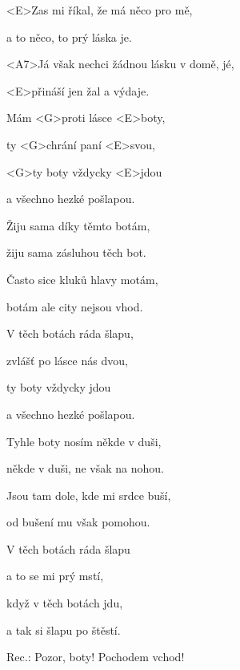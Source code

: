 

\zs
<E>Zas mi říkal, že má něco pro mě,

a to něco, to prý láska je.

<A7>Já však nechci žádnou lásku v domě, jé,

<E>přináší jen žal a výdaje.

Mám <G>proti lásce <E>boty,

ty <G>chrání paní <E>svou,

<G>ty boty vždycky <E>jdou

a všechno hezké pošlapou.
\ks

\zs
Žiju sama díky těmto botám,

žiju sama zásluhou těch bot.

Často sice kluků hlavy motám,

botám ale city nejsou vhod.

V těch botách ráda šlapu,

zvlášť po lásce nás dvou,

ty boty vždycky jdou

a všechno hezké pošlapou.
\ks

\zs
Tyhle boty nosím někde v duši,

někde v duši, ne však na nohou.

Jsou tam dole, kde mi srdce buší,

od bušení mu však pomohou.

V těch botách ráda šlapu

a to se mi prý mstí,

když v těch botách jdu,

a tak si šlapu po štěstí.
\ks

Rec.: Pozor, boty! Pochodem vchod!

\kp
